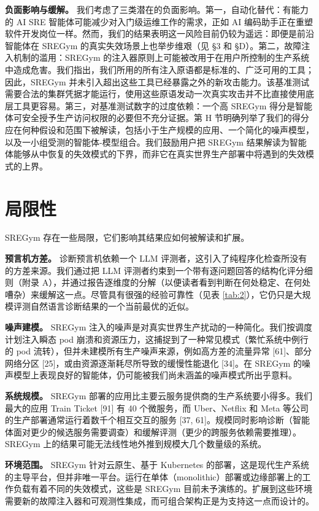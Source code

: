 \documentclass[11pt,UTF8,fontset=fandol]{ctexart}
\begin{document}
\textbf{负面影响与缓解。} 我们考虑了三类潜在的负面影响。第一，自动化替代：有能力的 AI SRE 智能体可能减少对入门级运维工作的需求，正如 AI 编码助手正在重塑软件开发岗位一样。然而，我们的结果表明这一风险目前仍较为遥远：即便是前沿智能体在 SREGym 的真实失效场景上也举步维艰（见 §3 和 §D）。第二，故障注入机制的滥用：SREGym 的注入器原则上可能被改用于在用户所控制的生产系统中造成危害。我们指出，我们所用的所有注入原语都是标准的、广泛可用的工具；因此，SREGym 并未引入超出这些工具已经暴露之外的新攻击能力。该基准测试需要合法的集群凭据才能运行，使用这些原语发动一次真实攻击并不比直接使用底层工具更容易。第三，对基准测试数字的过度依赖：一个高 SREGym 得分是智能体可安全授予生产访问权限的必要但不充分证据。第 H 节明确列举了我们的得分应在何种假设和范围下被解读，包括小于生产规模的应用、一个简化的噪声模型，以及一小组受测的智能体-模型组合。我们鼓励用户把 SREGym 结果解读为智能体能够从中恢复的失效模式的下界，而非它在真实世界生产部署中将遇到的失效模式的上界。

\section{局限性}

SREGym 存在一些局限，它们影响其结果应如何被解读和扩展。

\textbf{预言机方差。} 诊断预言机依赖一个 LLM 评测者，这引入了纯程序化检查所没有的方差来源。我们通过把 LLM 评测者约束到一个带有逐问题回答的结构化评分细则（附录 A），并通过报告逐维度的分解（以便读者看到判断在何处稳定、在何处嘈杂）来缓解这一点。尽管具有很强的经验可靠性（见表 \ref{tab:2}），它仍只是大规模评测自然语言诊断结果的一个当前最优的近似。

\textbf{噪声建模。} SREGym 注入的噪声是对真实世界生产扰动的一种简化。我们按调度计划注入瞬态 pod 崩溃和资源压力，这捕捉到了一种常见模式（繁忙系统中例行的 pod 流转），但并未建模所有生产噪声来源，例如高方差的流量异常 [61]、部分网络分区 [25]，或由资源逐渐耗尽所导致的缓慢性能退化 [34]。在 SREGym 的噪声模型上表现良好的智能体，仍可能被我们尚未涵盖的噪声模式所出乎意料。

\textbf{系统规模。} SREGym 部署的应用比主要云服务提供商的生产系统要小得多。我们最大的应用 Train Ticket [91] 有 40 个微服务，而 Uber、Netflix 和 Meta 等公司的生产部署通常运行着数千个相互交互的服务 [37, 61]。规模同时影响诊断（智能体面对更少的候选服务需要调查）和缓解评测（更少的跨服务依赖需要推理）。SREGym 上的结果可能无法线性地外推到规模大几个数量级的系统。

\textbf{环境范围。} SREGym 针对云原生、基于 Kubernetes 的部署，这是现代生产系统的主导平台，但并非唯一平台。运行在单体（monolithic）部署或边缘部署上的工作负载有着不同的失效模式，这些是 SREGym 目前未予演练的。扩展到这些环境需要新的故障注入器和可观测性集成，而可组合架构正是为支持这一点而设计的。
\end{document}
